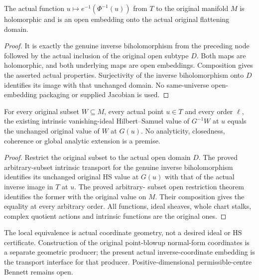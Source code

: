 \begin{theorem}
\label{hir:actual-flat-coordinate-inverse-open-embedding}
\leanok
The actual function $u\mapsto e^{-1}(\Phi^{-1}(u))$ from $T$ to the
original manifold $M$ is holomorphic and is an open embedding onto the
actual original flattening domain.
\end{theorem}
\begin{proof}
It is exactly the genuine inverse biholomorphism from the preceding
node followed by the actual inclusion of the original open subtype $D$.
Both maps are holomorphic, and both underlying maps are open embeddings.
Composition gives the asserted actual properties. Surjectivity of the
inverse biholomorphism onto $D$ identifies its image with that unchanged
domain. No same-universe open-embedding packaging or supplied Jacobian
is used.
\end{proof}

\begin{theorem}
\label{hir:actual-flat-coordinate-inverse-any-subset-intrinsic-hs}
\leanok
For every original subset $W\subseteq M$, every actual point $u\in T$
and every order $\ell$, the existing intrinsic vanishing-ideal
Hilbert--Samuel value of $G^{-1}W$ at $u$ equals the unchanged original
value of $W$ at $G(u)$. No analyticity, closedness, coherence or global
analytic extension is a premise.
\end{theorem}
\begin{proof}
Restrict the original subset to the actual open domain $D$. The proved
arbitrary-subset intrinsic transport for the genuine inverse
biholomorphism identifies its unchanged original HS value at $G(u)$
with that of the actual inverse image in $T$ at $u$. The proved arbitrary-
subset open restriction theorem identifies the former with the original
value on $M$. Their composition gives the equality at every arbitrary
order. All functions, ideal sheaves, whole chart stalks, complex quotient
actions and intrinsic functions are the original ones.
\end{proof}

The local equivalence is actual coordinate geometry, not a desired
ideal or HS certificate. Construction of the original point-blowup
normal-form coordinates is a separate geometric producer; the present
actual inverse-coordinate embedding is the transport interface for that
producer. Positive-dimensional permissible-centre Bennett remains open.
